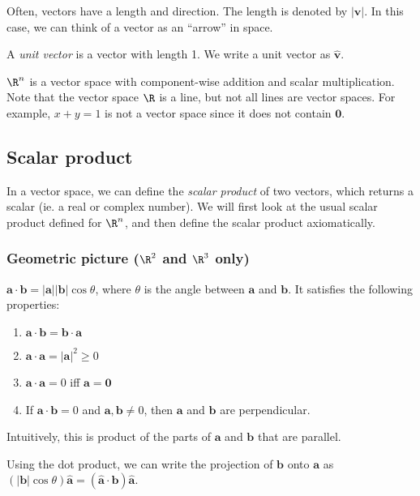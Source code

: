 \documentclass[a4paper]{article}
\begin{document}
Often, vectors have a length and direction. The length is denoted by $|\mathbf{v}|$. In this case, we can think of a vector as an ``arrow'' in space.
\begin{defi}
  A \emph{unit vector} is a vector with length 1. We write a unit vector as $\hat{\mathbf{v}}$.
\end{defi}

\begin{eg}
  $\R^n$ is a vector space with component-wise addition and scalar multiplication. Note that the vector space $\R$ is a line, but not all lines are vector spaces. For example, $x + y = 1$ is not a vector space since it does not contain $\mathbf{0}$.
\end{eg}

\subsection{Scalar product}
In a vector space, we can define the \emph{scalar product} of two vectors, which returns a scalar (ie. a real or complex number). We will first look at the usual scalar product defined for $\R^n$, and then define the scalar product axiomatically.

\subsubsection{Geometric picture (\texorpdfstring{$\R^2$}{R2} and \texorpdfstring{$\R^3$}{R3} only)}
\begin{defi}
  $\mathbf{a}\cdot\mathbf{b} = \mathbf{|a||b|}\cos\theta$, where $\theta$ is the angle between $\mathbf{a}$ and $\mathbf{b}$. It satisfies the following properties:
  \begin{enumerate}
    \item $\mathbf{a\cdot b = b\cdot a}$
    \item $\mathbf{a\cdot a = |a|}^2 \geq 0$
    \item $\mathbf{a\cdot a} = 0$ iff $\mathbf{a = 0}$
    \item If $\mathbf{a\cdot b} = 0$ and $\mathbf{a, b}\not= 0$, then $\mathbf{a}$ and $\mathbf{b}$ are perpendicular.
  \end{enumerate}
\end{defi}
Intuitively, this is product of the parts of $\mathbf{a}$ and $\mathbf{b}$ that are parallel.
\begin{center}
\end{center}
Using the dot product, we can write the projection of $\mathbf{b}$ onto $\mathbf{a}$ as $(|\mathbf{b}|\cos\theta)\hat{\mathbf{a}} = \mathbf{(\hat{a}\cdot b)\hat{a}}$.
\end{document}
